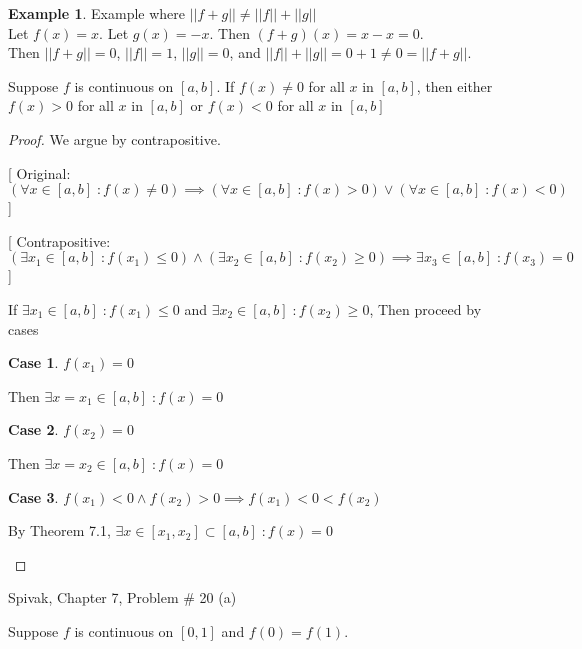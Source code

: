 \documentclass{article} %
\theoremstyle{plain}
\theoremstyle{definition}
\newtheorem*{example*}{Example}
\newtheorem{case}{Case}
\begin{document}
\begin{example*} Example where $||f + g|| \neq ||f|| + ||g||$ \\

    Let $f(x) = x$. Let $g(x) = -x$.  Then $(f+g)(x) = x - x = 0$. \\

    Then $||f+g|| = 0$, $||f|| = 1$, $||g|| = 0$, and $||f|| + ||g|| = 0 + 1 \neq 0 = ||f+g||$. \\

\end{example*}



\noindent{} Suppose $f$ is continuous on $[a,b]$. If $f(x) \neq 0$ for all $x$ in $[a,b]$, then either $f(x) > 0$ for all $x$ in $[a,b]$ or $f(x) < 0$ for all $x$ in $[a,b]$

\begin{proof} We argue by contrapositive.

    [ Original: $(\forall x \in [a,b] \; \colon f(x) \neq 0) \implies (\forall x \in [a,b] \; \colon f(x) > 0) \lor (\forall x \in [a,b] \; \colon f(x) < 0)$ ]

    [ Contrapositive: $(\exists x_1 \in [a,b] \; \colon f(x_1) \leq 0) \land (\exists x_2 \in [a,b] \; \colon f(x_2) \geq 0) \implies \exists x_3 \in [a,b] \; \colon f(x_3) = 0$ ]

    If $\exists x_1 \in [a,b] \; \colon f(x_1) \leq 0$ and $\exists x_2 \in [a,b] \; \colon f(x_2) \geq 0$, Then proceed by cases

    \begin{case} $f(x_1) = 0$

        Then $\exists x = x_1 \in [a,b] \; \colon f(x) = 0$
    \end{case}
    \begin{case} $f(x_2) = 0$

        Then $\exists x = x_2 \in [a,b] \; \colon f(x) = 0$
    \end{case}
    \begin{case} $f(x_1) < 0 \land f(x_2) > 0 \implies f(x_1) < 0 < f(x_2)$

        By Theorem 7.1, $\exists x \in [x_1,x_2] \subset [a,b] \; \colon f(x) = 0$
    \end{case}
\end{proof} 

\noindent{} Spivak, Chapter 7, Problem \# 20 (a)

Suppose $f$ is continuous on $[0,1]$ and $f(0) = f(1)$.
\end{document}
